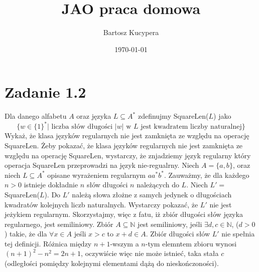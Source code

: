 \documentclass{article}
\title{JAO praca domowa}
\author{Bartosz Kucypera}
\date{\today}
\begin{document}
\maketitle

\section*{Zadanie 1.2} 

Dla danego alfabetu $A$ oraz języka $L \subseteq A^* $ zdefinujmy SquareLen($L$) jako
$$\{w \in \{1\}^* | \mbox{ liczba słów długości } |w| \mbox{ w $L$ jest kwadratem liczby naturalnej} \}$$
Wykaż, że klasa języków regularnych nie jest zamknięta ze względu na operację SquareLen. \newline
\newline
Żeby pokazać, że klasa języków regularnych nie jest zamknięta ze względu na operację SquareLen, wystarczy, że znjadziemy język regularny który operacja SquareLen przeprowadzi na język nie-regualrny.
\newline 
Niech $A = \{a, b\}$, oraz niech $L \subseteq A^*$ opisane wyrażeniem regularnym $aa^*b^*$. \newline
Zauważmy, że dla każdego $n > 0$ istnieje dokładnie $n$ słów długości $n$ należących do $L$. \newline
Niech $L' = $ SquareLen($L$). Do $L'$ należą słowa złożne z samych jedynek o długościach kwadratów kolejnych liczb naturalnych. \newline 
Wystarczy pokazać, że $L'$ nie jest jeżykiem regularnym. Skorzystajmy, więc z fatu, iż zbiór długości słów języka regularnego, jest semiliniowy. Zbiór $A \subseteq \mathbb{N}$ jest semiliniowy, jeśli $ \exists d,c \in \mathbb{N} $, ($d>0$) takie, że dla $ \forall x \in A$ jeśli $x > c$ to $x+d \in A$. \newline 
Zbiór długości słów $L'$ nie spełnia tej definicji. \newline 
Różnica między $n+1$-wszym a $n$-tym elemntem zbioru wynosi $(n+1)^2 - n^2 = 2n+1$, oczywiście więc nie może istnieć, taka stała $c$ (odległości pomiędzy kolejnymi elementami dążą do nieskończoności).
\end{document}
